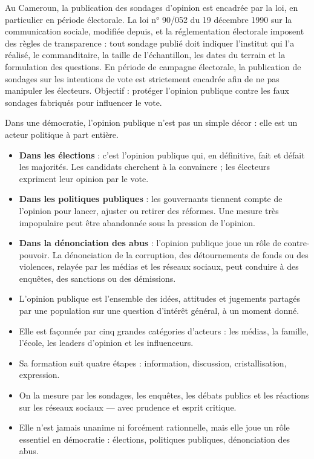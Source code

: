 \documentclass[11pt]{article}
\newcounter{popsec}
\newcounter{popsub}
\newcommand{\courssub}[1]{%
  \stepcounter{popsub}%
  \par\vspace{9pt}\noindent{\popxbold\fontsize{11.5}{13}\selectfont\color{popink}{\color{poporange}\thepopsec.\thepopsub}\hspace{6pt}#1}\par\nopagebreak\vspace{4pt}
}
\begin{document}
\begin{savaistu}
Au Cameroun, la publication des sondages d'opinion est encadrée par la loi, en particulier en période électorale. La loi n° 90/052 du 19 décembre 1990 sur la communication sociale, modifiée depuis, et la réglementation électorale imposent des règles de transparence : tout sondage publié doit indiquer l'institut qui l'a réalisé, le commanditaire, la taille de l'échantillon, les dates du terrain et la formulation des questions. En période de campagne électorale, la publication de sondages sur les intentions de vote est strictement encadrée afin de ne pas manipuler les électeurs. Objectif : protéger l'opinion publique contre les faux sondages fabriqués pour influencer le vote.
\end{savaistu}

\courssub{Opinion publique et démocratie}

Dans une démocratie, l'opinion publique n'est pas un simple décor : elle est un acteur politique à part entière.

\begin{itemize}
\item \textbf{Dans les élections} : c'est l'opinion publique qui, en définitive, fait et défait les majorités. Les candidats cherchent à la convaincre ; les électeurs expriment leur opinion par le vote.
\item \textbf{Dans les politiques publiques} : les gouvernants tiennent compte de l'opinion pour lancer, ajuster ou retirer des réformes. Une mesure très impopulaire peut être abandonnée sous la pression de l'opinion.
\item \textbf{Dans la dénonciation des abus} : l'opinion publique joue un rôle de contre-pouvoir. La dénonciation de la corruption, des détournements de fonds ou des violences, relayée par les médias et les réseaux sociaux, peut conduire à des enquêtes, des sanctions ou des démissions.
\end{itemize}

\begin{aretenir}
\begin{itemize}
\item L'opinion publique est l'ensemble des idées, attitudes et jugements partagés par une population sur une question d'intérêt général, à un moment donné.
\item Elle est façonnée par cinq grandes catégories d'acteurs : les médias, la famille, l'école, les leaders d'opinion et les influenceurs.
\item Sa formation suit quatre étapes : information, discussion, cristallisation, expression.
\item On la mesure par les sondages, les enquêtes, les débats publics et les réactions sur les réseaux sociaux — avec prudence et esprit critique.
\item Elle n'est jamais unanime ni forcément rationnelle, mais elle joue un rôle essentiel en démocratie : élections, politiques publiques, dénonciation des abus.
\end{itemize}
\end{aretenir}
\end{document}
